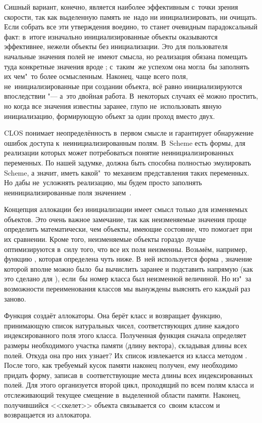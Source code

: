 Сишный вариант, конечно, является наиболее эффективным с~точки зрения скорости,
так как выделенную память не~надо ни инициализировать, ни очищать. Если собрать
все эти утверждения воедино, то станет очевидным парадоксальный факт: в~итоге
изначально инициализированные объекты оказываются эффективнее, нежели объекты
без инициализации. Это для пользователя начальные значения полей не~имеют
смысла, но реализация обязана помещать туда конкретные значения вроде
; с~таким~же успехом она могла~бы заполнять их чем"~то
более осмысленным. Наконец, чаще всего поля, не~инициализированные при создании
объекта, всё равно инициализируются впоследствии "--- а~это двойная работа.
В~некоторых случаях её можно простить, но когда все значения известны заранее,
глупо не~использовать явную инициализацию, формирующую объект за один проход
вместо двух.

CLOS понимает неопределённость в~первом смысле и гарантирует обнаружение ошибок
доступа к~неинициализированным полям. В~Scheme есть формы, для реализации
которых может потребоваться понятие неинициализированных переменных.
 По нашей задумке,
{\Meroonet} должна быть способна полностью эмулировать Scheme, а значит, иметь
какой"~то механизм представления таких переменных. Но дабы не~усложнять
реализацию, мы будем просто заполнять неинициализированные поля
значением~.

Концепция аллокации без инициализации имеет смысл только для изменяемых
объектов. Это очень важное замечание, так как неизменяемые значения проще
определить математически, чем объекты, имеющие состояние, что помогает при их
сравнении.  Кроме того,
неизменяемые объекты гораздо лучше оптимизируются в~силу того, что все их поля
неизменны. Возьмём, например, функцию , которая определена
чуть ниже. В~ней используется форма , значение которой
вполне можно было~бы вычислить заранее и подставить напрямую (как это сделано
для ), если~бы номер класса был неизменной величиной.
Но из"~за возможности переименования классов мы вынуждены выяснять его каждый
раз заново.

Функция  создаёт аллокаторы. Она берёт класс и возвращает
функцию, принимающую список натуральных чисел, соответствующих длине каждого
индексированного поля этого класса. Полученная функция сначала определяет
размеры необходимого участка памяти (длину вектора), складывая длины всех полей.
Откуда она про них узнает? Их список извлекается из класса методом
. После того, как требуемый кусок памяти наконец получен, ему
необходимо придать форму, записав в~соответствующие места длины всех
индексированных полей. Для этого организуется второй цикл, проходящий по всем
полям класса и отслеживающий текущее смещение в~выделенной области памяти.
Наконец, получившийся <<скелет>> объекта связывается со~своим классом и
возвращается из аллокатора.

